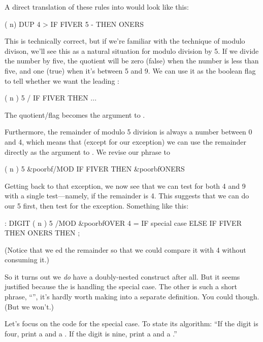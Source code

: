 A direct translation of these rules into \Forth{} would look like this:

\begin{Code}
( n)  DUP  4 > IF  FIVER 5 -  THEN  ONERS
\end{Code}
This is technically correct, but if we're familiar with the technique of
modulo divison, we'll see this as a natural situation for modulo division
by 5. If we divide the number by five, the quotient will be zero (false)
when the number is less than five, and one (true) when it's between 5 and
9. We can use it as the boolean flag to tell whether we want the leading
:

\begin{Code}
( n )  5 / IF FIVER THEN ...
\end{Code}
The quotient/flag becomes the argument to .

Furthermore, the remainder of modulo 5 division is always a
number between 0 and 4, which means that (except for our exception) we
can use the remainder directly as the argument to . We revise our
phrase to

\begin{Code}[commandchars=\&\{\}]
( n )  5 &poorbf{/MOD} IF FIVER THEN  &poorbf{ONERS}
\end{Code}
Getting back to that exception, we now see that we can test for both 4
and 9 with a single test---namely, if the remainder is 4. This suggests that
we can do our 5  first, then test for the exception. Something like
this:

\begin{Code}[commandchars=\&\{\}]
: DIGIT  ( n )
     5 /MOD  &poorbf{OVER 4 =  IF  special case  ELSE}
     IF FIVER THEN  ONERS  THEN ;
\end{Code}
(Notice that we ed the remainder so that we could compare it with
4 without consuming it.)

So it turns out we \emph{do} have a doubly-nested  construct
after all. But it seems justified because the  is handling the
special case. The other is such a short phrase, ``'', it's
hardly worth making into a separate definition. You could though. (But we
won't.)

Let's focus on the code for the special case. To state its algorithm:
``If the digit is four, print a  and a . If the digit is nine, print
a  and a .''


